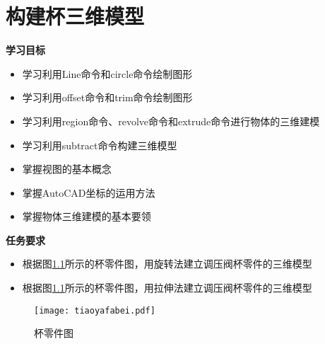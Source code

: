 \chapter{构建杯三维模型}\label{chap:bei}

{\bfseries 学习目标}
\begin{itemize}
\item 学习利用Line命令和circle命令绘制图形
\item 学习利用offset命令和trim命令绘制图形
\item 学习利用region命令、revolve命令和extrude命令进行物体的三维建模
\item 学习利用subtract命令构建三维模型
\item 掌握视图的基本概念
\item 掌握AutoCAD坐标的运用方法
\item 掌握物体三维建模的基本要领
\end{itemize}

{\bfseries 任务要求}
\begin{itemize}
\item 根据图\ref{fig:tiaoyafabei}所示的杯零件图，用旋转法建立调压阀杯零件的三维模型
\item 根据图\ref{fig:tiaoyafabei}所示的杯零件图，用拉伸法建立调压阀杯零件的三维模型
\end{itemize}

\noindent
\begin{figure}[htbp]
\centering
\texttt{[image: tiaoyafabei.pdf]}
\caption{杯零件图}\label{fig:tiaoyafabei}
\end{figure}
\clearpage







\endinput